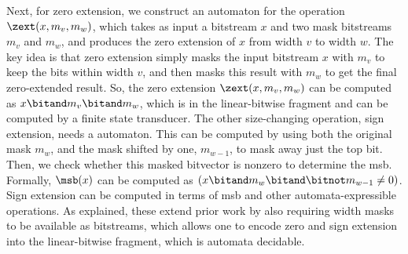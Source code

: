 Next, for zero extension, we construct an automaton for the operation $\zext(x, m_v, m_w)$,
which takes as input a bitstream $x$ and two mask bitstreams $m_v$ and $m_w$,
and produces the zero extension of $x$ from width $v$ to width $w$.
The key idea is that zero extension simply masks the input bitstream $x$ with $m_v$ to keep the bits within width $v$,
and then masks this result with $m_w$ to get the final zero-extended result.
So, the zero extension $\zext(x, m_v, m_w)$ can be computed as $x \bitand m_v \bitand m_w$,
which is in the linear-bitwise fragment and can be computed by a finite state transducer.
The other size-changing operation, sign extension, needs a \msb{} automaton.
This can be computed by using both the original mask $m_w$, and the mask shifted by one, $m_{w-1}$,
to mask away just the top bit. Then, we check whether this masked bitvector is nonzero to determine the msb.
Formally, $\msb(x)$ can be computed as $(x \bitand m_w \bitand \bitnot  m_{w-1} \neq 0)$.
Sign extension can be computed in terms of msb and other automata-expressible operations.
As explained, these extend prior work by also requiring width masks to be available as bitstreams,
which allows one to encode zero and sign extension into the linear-bitwise fragment, which is automata decidable.

